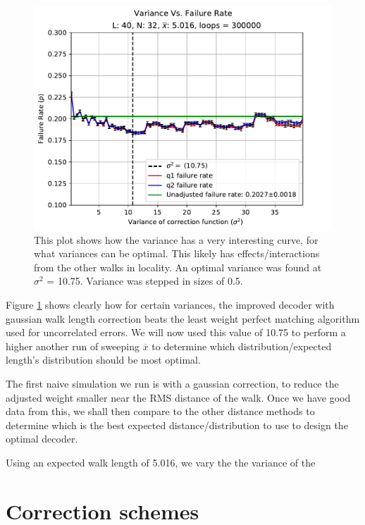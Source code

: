 \begin{figure}[htpb]
	\includegraphics{figs/improvementl300000L40True_3398b43b399345d183a59bfda7727a61.pdf}
	\caption{This plot shows how the variance has a very interesting curve, for what variances can be optimal. This likely has effects/interactions from the other walks in locality. An optimal variance was found at $\sigma^2$ = 10.75. Variance was stepped in sizes of 0.5.}
	\label{fig:varplot}
\end{figure}
Figure \ref{fig:varplot} shows clearly how for certain variances, the improved decoder with gaussian walk length correction beats the least weight perfect matching algorithm used for uncorrelated errors. We will now used this value of 10.75 to perform a higher another run of sweeping $\overline{x}$ to determine which distribution/expected length's distribution should be most optimal. 




The first naive simulation we run is with a gaussian correction, to reduce the adjusted weight smaller near the RMS distance of the walk. Once we have good data from this, we shall then compare to the other distance methods to determine which is the best expected distance/distribution to use to design the optimal decoder. 

Using an expected walk length of 5.016, we vary the the variance of the 



\section{Correction schemes}

